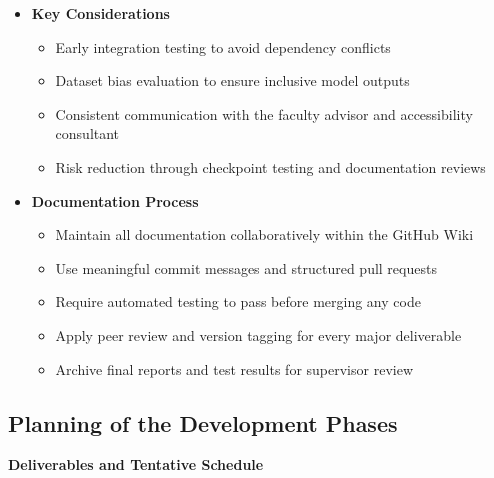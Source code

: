\documentclass[12pt]{article}
\begin{document}
\begin{itemize}
    \item \textbf{Key Considerations}
    \begin{itemize}
        \item Early integration testing to avoid dependency conflicts  
        \item Dataset bias evaluation to ensure inclusive model outputs  
        \item Consistent communication with the faculty advisor and accessibility consultant  
        \item Risk reduction through checkpoint testing and documentation reviews  
    \end{itemize}

    \item \textbf{Documentation Process}
    \begin{itemize}
        \item Maintain all documentation collaboratively within the GitHub Wiki  
        \item Use meaningful commit messages and structured pull requests  
        \item Require automated testing to pass before merging any code  
        \item Apply peer review and version tagging for every major deliverable  
        \item Archive final reports and test results for supervisor review  
    \end{itemize}
\end{itemize}

\subsection{Planning of the Development Phases}

\textbf{Deliverables and Tentative Schedule}
\end{document}

